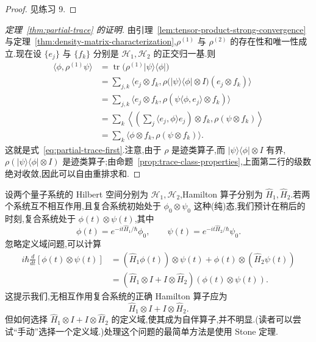 \begin{proof}
见练习 9.
\end{proof}

\begin{proof}[定理~\ref{thm:partial-trace} 的证明]
由引理~\ref{lem:tensor-product-strong-convergence} 与定理~\ref{thm:density-matrix-characterization},$\rho^{(1)}$ 与 $\rho^{(2)}$ 的存在性和唯一性成立.现在设 $\{e_j\}$ 与 $\{f_k\}$ 分别是 $\mathcal H_1,\mathcal H_2$ 的正交归一基.则
\[
\begin{aligned}
 \langle\phi,\rho^{(1)}\psi\rangle
 &=\operatorname{tr}\bigl(\rho^{(1)}|\psi\rangle\langle\phi|\bigr)\\
 &=\sum_{j,k}\langle e_j\otimes f_k,
 \rho\bigl(|\psi\rangle\langle\phi|\otimes I\bigr)(e_j\otimes f_k)\rangle\\
 &=\sum_{j,k}\langle e_j\otimes f_k,
 \rho(\psi\langle\phi,e_j\rangle\otimes f_k)\rangle\\
 &=\sum_k\left\langle\left(\sum_j\langle e_j,\phi\rangle e_j\right)
 \otimes f_k,\rho(\psi\otimes f_k)\right\rangle\\
 &=\sum_k\langle\phi\otimes f_k,\rho(\psi\otimes f_k)\rangle.
\end{aligned}
\]
这就是式~\eqref{eq:partial-trace-first}.注意,由于 $\rho$ 是迹类算子,而 $|\psi\rangle\langle\phi|\otimes I$ 有界,$\rho(|\psi\rangle\langle\phi|\otimes I)$ 是迹类算子;由命题~\ref{prop:trace-class-properties},上面第二行的级数绝对收敛,因此可以自由重排求和.
\end{proof}

设两个量子系统的 Hilbert 空间分别为 $\mathcal H_1,\mathcal H_2$,Hamilton 算子分别为 $\widehat H_1,\widehat H_2$.若两个系统互不相互作用,且复合系统初始处于 $\phi_0\otimes\psi_0$ 这种(纯)态,我们预计在稍后的时刻,复合系统处于 $\phi(t)\otimes\psi(t)$,其中
\[
 \phi(t)=e^{-it\widehat H_1/\hbar}\phi_0,\qquad
 \psi(t)=e^{-it\widehat H_2/\hbar}\psi_0.
\]
忽略定义域问题,可以计算
\[
\begin{aligned}
 i\hbar\frac{d}{dt}[\phi(t)\otimes\psi(t)]
 &= (\widehat H_1\phi(t))\otimes\psi(t)
 +\phi(t)\otimes(\widehat H_2\psi(t))\\
 &= (\widehat H_1\otimes I+I\otimes\widehat H_2)
 (\phi(t)\otimes\psi(t)).
\end{aligned}
\]
这提示我们,无相互作用复合系统的正确 Hamilton 算子应为
\[
 \widehat H_1\otimes I+I\otimes\widehat H_2.
\]
但如何选择 $\widehat H_1\otimes I+I\otimes\widehat H_2$ 的定义域,使其成为自伴算子,并不明显.(读者可以尝试“手动”选择一个定义域.)处理这个问题的最简单方法是使用 Stone 定理.

